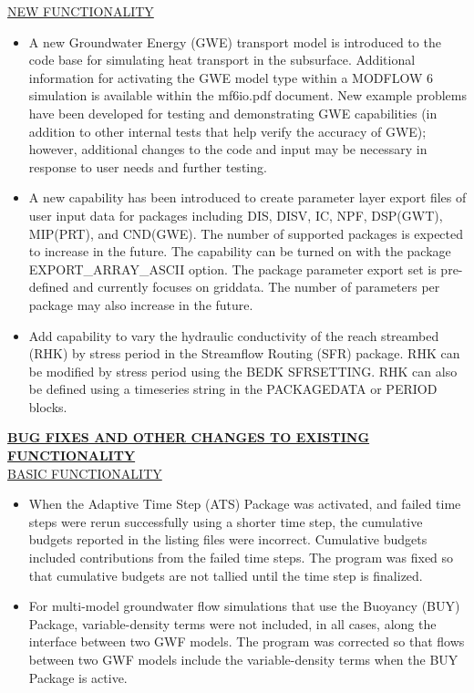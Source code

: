 	
	\item \currentmodflowversion
	
	\underline{NEW FUNCTIONALITY}
	\begin{itemize}
		\item A new Groundwater Energy (GWE) transport model is introduced to the code base for simulating heat transport in the subsurface.  Additional information for activating the GWE model type within a MODFLOW 6 simulation is available within the mf6io.pdf document.  New example problems have been developed for testing and demonstrating GWE capabilities (in addition to other internal tests that help verify the accuracy of GWE); however, additional changes to the code and input may be necessary in response to user needs and further testing.
	    \item A new capability has been introduced to create parameter layer export files of user input data for packages including DIS, DISV, IC, NPF, DSP(GWT), MIP(PRT), and CND(GWE).  The number of supported packages is expected to increase in the future.  The capability can be turned on with the package EXPORT\_ARRAY\_ASCII option.  The package parameter export set is pre-defined and currently focuses on griddata.  The number of parameters per package may also increase in the future.
    	\item Add capability to vary the hydraulic conductivity of the reach streambed (RHK) by stress period in the Streamflow Routing (SFR) package. RHK can be modified by stress period using the BEDK SFRSETTING. RHK can also be defined using a timeseries string in the PACKAGEDATA or PERIOD blocks.
	\end{itemize}


	\textbf{\underline{BUG FIXES AND OTHER CHANGES TO EXISTING FUNCTIONALITY}} \\
	\underline{BASIC FUNCTIONALITY}
	\begin{itemize}
		\item When the Adaptive Time Step (ATS) Package was activated, and failed time steps were rerun successfully using a shorter time step, the cumulative budgets reported in the listing files were incorrect.  Cumulative budgets included contributions from the failed time steps.  The program was fixed so that cumulative budgets are not tallied until the time step is finalized.
		\item For multi-model groundwater flow simulations that use the Buoyancy (BUY) Package, variable-density terms were not included, in all cases, along the interface between two GWF models.  The program was corrected so that flows between two GWF models include the variable-density terms when the BUY Package is active.
	\end{itemize}

